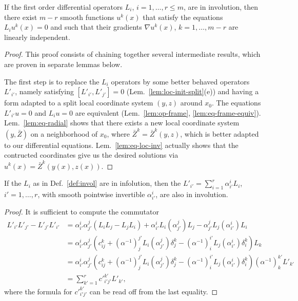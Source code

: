 \begin{theorem} \label{thm:frob-loc}
If the first order differential operators $L_i$, $i=1,\ldots,r \le m$, are in
involution, then there exist $m-r$ smooth functions $u^k(x)$ that satisfy the
equations $L_i u^k(x) = 0$ and such that their gradients $\nabla u^k(x)$,
$k=1,\ldots,m-r$ are linearly independent.
\end{theorem}
\begin{proof}
This proof consists of chaining together several intermediate results, which are
proven in separate lemmas below.

The first step is to replace the $L_i$ operators by some better behaved
operators $L'_{i'}$, namely satisfying $[L'_{i'}, L'_{j'}] = 0$
(Lem.~\ref{lem:loc-init-split}(e)) and having a form adapted to a split local
coordinate system $(y,z)$ around $x_0$. The equations $L'_{i'} u = 0$ and $L_i u
= 0$ are equivalent (Lem.~\ref{lem:op-frame}, \ref{lem:eq-frame-equiv}).
Lem.~\ref{lem:eq-radial} shows that there exists a new local coordinate system
$(y,\bar{Z})$ on a neighborhood of $x_0$, where $\bar{Z}^k=\bar{Z}^k(y,z)$,
which is better adapted to our differential equations. Lem.~\ref{lem:eq-loc-inv}
actually shows that the contructed coordinates give us the desired solutions via
$u^k(x) = \bar{Z}^k(y(x),z(x))$.
\end{proof}

\begin{lemma} \label{lem:op-frame}
If the $L_i$ as in Def.~\ref{def:invol} are in infolution, then the $L'_{i'} =
\sum_{i=1}^r \alpha_{i'}^i L_i$, $i'=1,\ldots,r$, with smooth pointwise invertible
$\alpha_{i'}^i$, are also in involution.
\end{lemma}
\begin{proof}
It is sufficient to compute the commutator
\begin{align*}
  L'_{i'} L'_{j'} - L'_{j'} L'_{i'}
  &= \alpha_{i'}^i \alpha_{j'}^j (L_i L_j - L_j L_i)
    + \alpha_{i'}^i L_i(\alpha_{j'}^j) L_j
    - \alpha_{j'}^j L_j(\alpha_{i'}^i) L_i
  \\
  &= \alpha_{i'}^i \alpha_{j'}^j \left(c_{ij}^k
    + (\alpha^{-1})_j^{j'} L_i(\alpha_{j'}^j) \delta_j^k
    - (\alpha^{-1})_i^{i'} L_j(\alpha_{i'}^i) \delta_i^k \right) L_k
  \\
  &= \alpha_{i'}^i \alpha_{j'}^j \left(c_{ij}^k
    + (\alpha^{-1})_j^{j'} L_i(\alpha_{j'}^j) \delta_j^k
    - (\alpha^{-1})_i^{i'} L_j(\alpha_{i'}^i) \delta_i^k \right) (\alpha^{-1})_k^{k'} L'_{k'}
  \\
  &= \sum_{k'=1}^r c'^{k'}_{i'j'} L'_{k'} ,
\end{align*}
where the formula for $c'^{k'}_{i'j'}$ can be read off from the last equality.
\end{proof}

